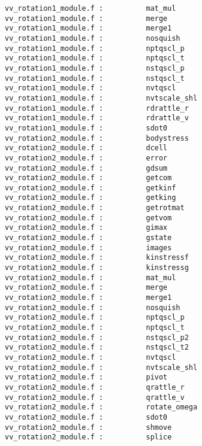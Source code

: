 \begin{verbatim}
vv_rotation1_module.f :          mat_mul 
vv_rotation1_module.f :          merge 
vv_rotation1_module.f :          merge1 
vv_rotation1_module.f :          nosquish 
vv_rotation1_module.f :          nptqscl_p 
vv_rotation1_module.f :          nptqscl_t 
vv_rotation1_module.f :          nstqscl_p 
vv_rotation1_module.f :          nstqscl_t 
vv_rotation1_module.f :          nvtqscl 
vv_rotation1_module.f :          nvtscale_shl 
vv_rotation1_module.f :          rdrattle_r 
vv_rotation1_module.f :          rdrattle_v 
vv_rotation1_module.f :          sdot0
vv_rotation2_module.f :          bodystress 
vv_rotation2_module.f :          dcell 
vv_rotation2_module.f :          error 
vv_rotation2_module.f :          gdsum 
vv_rotation2_module.f :          getcom 
vv_rotation2_module.f :          getkinf
vv_rotation2_module.f :          getking 
vv_rotation2_module.f :          getrotmat 
vv_rotation2_module.f :          getvom 
vv_rotation2_module.f :          gimax 
vv_rotation2_module.f :          gstate 
vv_rotation2_module.f :          images 
vv_rotation2_module.f :          kinstressf 
vv_rotation2_module.f :          kinstressg 
vv_rotation2_module.f :          mat_mul 
vv_rotation2_module.f :          merge 
vv_rotation2_module.f :          merge1 
vv_rotation2_module.f :          nosquish 
vv_rotation2_module.f :          nptqscl_p 
vv_rotation2_module.f :          nptqscl_t 
vv_rotation2_module.f :          nstqscl_p2 
vv_rotation2_module.f :          nstqscl_t2 
vv_rotation2_module.f :          nvtqscl 
vv_rotation2_module.f :          nvtscale_shl 
vv_rotation2_module.f :          pivot 
vv_rotation2_module.f :          qrattle_r 
vv_rotation2_module.f :          qrattle_v 
vv_rotation2_module.f :          rotate_omega 
vv_rotation2_module.f :          sdot0
vv_rotation2_module.f :          shmove 
vv_rotation2_module.f :          splice 
\end{verbatim}
